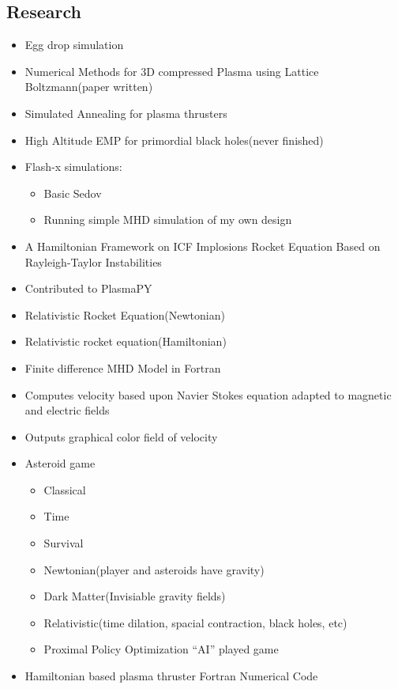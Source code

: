 \subsection{Research}
\begin{itemize}
    \item Egg drop simulation
    \item Numerical Methods for 3D compressed Plasma using Lattice Boltzmann(paper written)
    \item Simulated Annealing for plasma thrusters
    \item High Altitude EMP for primordial black holes(never finished) 
    \item Flash-x simulations:
    \begin{itemize}
        \item Basic Sedov
        \item Running simple MHD simulation of my own design
    \end{itemize}
    \item A Hamiltonian Framework on ICF Implosions Rocket Equation Based on Rayleigh-Taylor Instabilities
    \item Contributed to PlasmaPY
    \item Relativistic Rocket Equation(Newtonian)
    \item Relativistic rocket equation(Hamiltonian)
    \item Finite difference MHD Model in Fortran
    \item Computes velocity based upon Navier Stokes equation adapted to magnetic and electric fields
    \item Outputs graphical color field of velocity 
    \item Asteroid game
    \begin{itemize}
        \item Classical
        \item Time
        \item Survival
        \item Newtonian(player and asteroids have gravity)
        \item Dark Matter(Invisiable gravity fields)
        \item Relativistic(time dilation, spacial contraction, black holes, etc)
        \item Proximal Policy Optimization “AI” played game
    \end{itemize}
    \item Hamiltonian based plasma thruster Fortran Numerical Code

\end{itemize}
